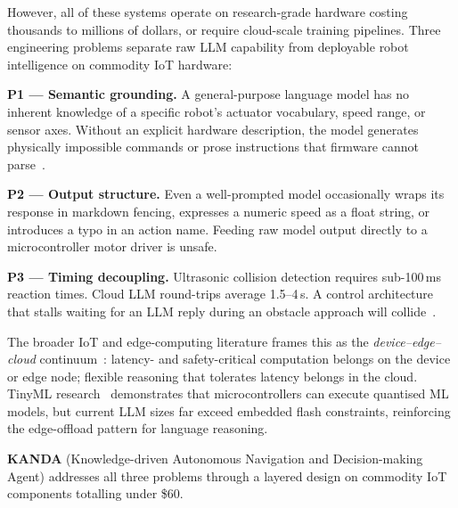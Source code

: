 \documentclass[conference]{IEEEtran}
\begin{document}
However, all of these systems operate on research-grade hardware costing
thousands to millions of dollars, or require cloud-scale training pipelines.
Three engineering problems separate raw LLM capability from deployable robot
intelligence on commodity IoT hardware:

\textbf{P1 --- Semantic grounding.}
A general-purpose language model has no inherent knowledge of a specific
robot's actuator vocabulary, speed range, or sensor axes.
Without an explicit hardware description, the model generates
physically impossible commands or prose instructions that firmware cannot
parse~\cite{ahn2022saycan, vemprala2024chatgpt}.

\textbf{P2 --- Output structure.}
Even a well-prompted model occasionally wraps its response in markdown fencing,
expresses a numeric speed as a float string, or introduces a typo in an action
name.
Feeding raw model output directly to a microcontroller motor driver is unsafe.

\textbf{P3 --- Timing decoupling.}
Ultrasonic collision detection requires sub-100\,ms reaction times.
Cloud LLM round-trips average 1.5--4\,s.
A control architecture that stalls waiting for an LLM reply during an
obstacle approach will collide~\cite{brooks1986robust}.

The broader IoT and edge-computing literature frames this as the
\emph{device--edge--cloud} continuum~\cite{bonomi2012fog, shi2016edge}:
latency- and safety-critical computation belongs on the device or edge node;
flexible reasoning that tolerates latency belongs in the cloud.
TinyML research~\cite{warden2020tinyml, david2021tflitemicro, lin2020mcunet}
demonstrates that microcontrollers can execute quantised ML models, but
current LLM sizes far exceed embedded flash constraints, reinforcing the
edge-offload pattern for language reasoning.

\textbf{KANDA} (Knowledge-driven Autonomous Navigation and Decision-making
Agent) addresses all three problems through a layered design on commodity IoT
components totalling under \$60.
\end{document}
